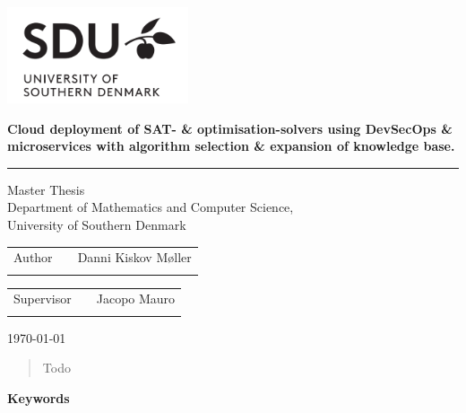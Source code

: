 \documentclass[12pt]{article}
\begin{document}

\begin{titlepage}
\Large
\includegraphics[width=0.4\textwidth]{logo.png}
\renewcommand{\thepage}{Title}
\thispagestyle{empty}
   \begin{center}
       \vspace*{1cm}
\linespread{1.25}
       {\doublespacing \Huge\textbf{Cloud deployment of SAT- \& optimisation-solvers using DevSecOps \& microservices with algorithm selection \& expansion of knowledge base.}}
\linespread{1}
       \rule{\linewidth}{1pt}
       {\huge Master Thesis \\
       \Large Department of Mathematics and Computer Science, \\
       University of Southern Denmark}
\end{center}
\vspace{5cm}
\Large
\begin{tabularx}{\textwidth}{lXr}
Author & & Danni Kiskov Møller \\ \\
\end{tabularx}
\begin{tabularx}{\textwidth}{lXr}
Supervisor & & Jacopo Mauro\\ \\
\end{tabularx}

\vfill
\large \today
\end{titlepage}

\thispagestyle{empty}



\thispagestyle{empty}
\tableofcontents
\thispagestyle{empty}
\newpage
{}

\renewcommand{\abstractname}{Abstract}
\begin{abstract}
Todo
\end{abstract}

\begin{center} \bf Keywords \end{center}

\thispagestyle{empty}
\tableofcontents
\thispagestyle{empty}
\newpage
{}
\end{document}

